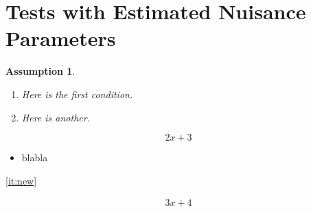 \documentclass{article}
\newtheorem{ass}{Assumption}
\begin{document}
\section{Tests with Estimated Nuisance Parameters}
\label{sec:testWithPihat}

\begin{ass}
  \label{ass:C}
  \begin{enumerate}
  \item\label{ass:C:First} Here is the first condition.
  \item\label{ass:C:Second} Here is another.
  \end{enumerate}
\end{ass}

\begin{equation*}
  2x +3
\end{equation*}

\begin{itemize}
\item \label{it:new} blabla
\end{itemize}

\ref{it:new}

\begin{multline}
  \label{mult}
  3x + 4
\end{multline}
\end{document}
